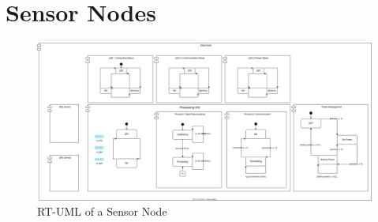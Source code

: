 \section{Sensor Nodes}

\begin{figure}[ht!]
   \centering
   \includegraphics[width=\textwidth]{../../assets/diagrams/edge_node_rtuml/edge_node_rtuml.png}
   \hfill
   \caption{RT-UML of a Sensor Node}
   \label{fig:rt_uml_sensor_node}
\end{figure}

